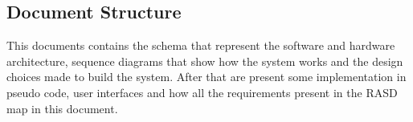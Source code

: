 \subsection{Document Structure}
	This documents contains the schema that represent the software and hardware architecture, sequence diagrams that show how the system works and the design choices made to build the system. After that are present some implementation in pseudo code, user interfaces and how all the requirements present in the RASD map in this document.